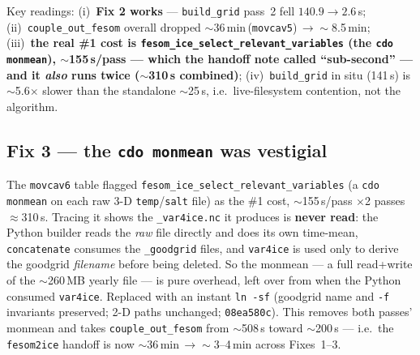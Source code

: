 \documentclass[11pt,a4paper]{article}
\newcommand{\code}[1]{\texttt{\small #1}}
\begin{document}
Key readings: (i)~\textbf{Fix 2 works} --- \code{build\_grid} pass~2 fell $140.9\to2.6$\,s;
(ii)~\code{couple\_out\_fesom} overall dropped $\sim$36\,min\,(\code{movcav5})\,$\to\sim$8.5\,min;
(iii)~\textbf{the real \#1 cost is \code{fesom\_ice\_select\_relevant\_variables} (the
\code{cdo monmean}), $\sim$155\,s/pass --- which the handoff note called ``sub-second'' --- and it
\emph{also} runs twice ($\sim$310\,s combined)}; (iv)~\code{build\_grid} in situ (141\,s) is
$\sim$5.6$\times$ slower than the standalone $\sim$25\,s, i.e.\ live-filesystem contention, not the
algorithm.

\subsection{Fix 3 --- the \code{cdo monmean} was vestigial}
The \code{movcav6} table flagged \code{fesom\_ice\_select\_relevant\_variables} (a
\code{cdo monmean} on each raw 3-D \code{temp}/\code{salt} file) as the \#1 cost, $\sim$155\,s/pass
$\times$2 passes $\approx$310\,s. Tracing it shows the \code{*\_var4ice.nc} it produces is
\textbf{never read}: the Python builder reads the \emph{raw} file directly and does its own
time-mean, \code{concatenate} consumes the \code{*\_goodgrid} files, and \code{var4ice} is used
only to derive the goodgrid \emph{filename} before being deleted. So the monmean --- a full
read+write of the $\sim$260\,MB yearly file --- is pure overhead, left over from when the Python
consumed \code{var4ice}. Replaced with an instant \code{ln -sf} (goodgrid name and \code{-f}
invariants preserved; 2-D paths unchanged; \code{08ea580c}). This removes both passes' monmean
and takes \code{couple\_out\_fesom} from $\sim$508\,s toward $\sim$200\,s --- i.e.\ the
\code{fesom2ice} handoff is now $\sim$36\,min\,$\to\sim$3--4\,min across Fixes~1--3.
\end{document}
